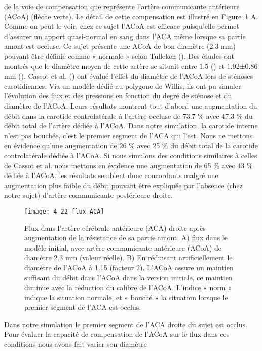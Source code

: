 de la voie de compensation que représente l’artère communicante antérieure (ACoA) (flèche verte).
Le détail de cette compensation est illustré en Figure~\ref{fig:4_22_flux_ACA} A. Comme on peut le voir, chez ce sujet l’ACoA
est efficace puisqu’elle permet d’assurer un apport quasi-normal en sang dans l’ACA même lorsque sa
partie amont est occluse. Ce sujet présente une ACoA de bon diamètre (2.3 mm) pouvant être définie
comme « normale » selon Tulleken (\cite{Tulleken1978}). Des études ont montrés que le diamètre moyen de cette
artère se situait entre 1.5 (\cite{Perlmutter1976}) et 1.92±0.86 mm (\cite{Hillen1986}). Cassot et al. (\cite{Cassot1995}) ont évalué l’effet du diamètre
de l’ACoA lors de sténoses carotidiennes. Via un modèle dédié au polygone de Willis, ils ont pu simuler
l’évolution des flux et des pressions en fonction du degré de sténose et du diamètre de l’ACoA. Leurs
résultats montrent tout d’abord une augmentation du débit dans la carotide controlatérale à l’artère
occluse de 73.7 \% avec 47.3 \% du débit total de l’artère dédiée à l’ACoA. Dans notre simulation, la
carotide interne n’est pas bouchée, c’est le premier segment de l’ACA qui l’est. Nous ne mettons en
évidence qu’une augmentation de 26 \% avec 25 \% du débit total de la carotide controlatérale dédiée
à l’ACoA. Si nous simulons des conditions similaires à celles de Cassot et al. nous mettons en évidence
une augmentation de 65 \% avec 43 \% dédiée à l’ACoA, les résultats semblent donc concordants malgré
une augmentation plus faible du débit pouvant être expliquée par l’absence (chez notre sujet) d’artère
communicante postérieure droite.\\
\begin{figure}[!t]
\centering
\texttt{[image: 4\_22\_flux\_ACA]}
\caption{ Flux dans l'artère cérébrale antérieure (ACA) droite après augmentation de la résistance de sa partie amont. A)
flux dans le modèle initial, avec artère communicante antérieure (ACoA) de diamètre 2.3 mm (valeur réelle). B) En réduisant
artificiellement le diamètre de l’ACoA à 1.15 (facteur 2). L’ACoA assure un maintien suffisant du débit dans l’ACoA dans la
version initiale, ce maintien diminue avec la réduction du calibre de l’ACoA. L’indice « norm » indique la situation normale, et
« bouché » la situation lorsque le premier segment de l’ACA est occlus.}
\label{fig:4_22_flux_ACA}	
\end{figure}
Dans notre simulation le premier segment de l’ACA droite du sujet est occlus. Pour évaluer la
capacité de compensation de l’ACoA sur le flux dans ces conditions nous avons fait varier son diamètre
